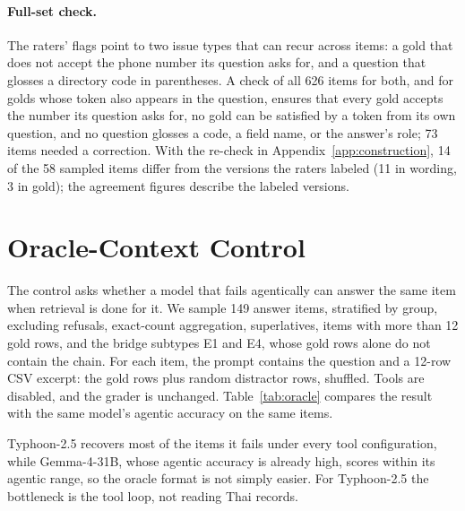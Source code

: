 \documentclass[11pt]{article}
\begin{document}
\paragraph{Full-set check.} The raters' flags point to two issue types that can recur across items: a
gold that does not accept the phone number its question asks for, and a question that glosses a
directory code in parentheses. A check of all 626 items for both, and for golds whose token also appears
in the question, ensures that every gold accepts the number its question asks for, no gold can be
satisfied by a token from its own question, and no question glosses a code, a field name, or the answer's
role; 73 items needed a correction. With the re-check in Appendix~\ref{app:construction}, 14 of the 58
sampled items differ from the versions the raters labeled (11 in wording, 3 in gold); the agreement
figures describe the labeled versions.

\section{Oracle-Context Control}
\label{app:oracle}

The control asks whether a model that fails agentically can answer the same item when retrieval is done
for it. We sample 149 answer items, stratified by group, excluding refusals, exact-count aggregation,
superlatives, items with more than 12 gold rows, and the bridge subtypes E1 and E4, whose gold rows alone
do not contain the chain. For each item, the prompt contains the question and a 12-row CSV excerpt: the
gold rows plus random distractor rows, shuffled. Tools are disabled, and the grader is unchanged.
Table~\ref{tab:oracle} compares the result with the same model's agentic accuracy on the same items.

\begin{table}[h]
\centering
\small

\caption{Oracle-context control on 149 answer items. \emph{Recovered} counts the items that the model
fails under all four tool configurations but answers correctly in the oracle setting.}
\label{tab:oracle}
\end{table}

Typhoon-2.5 recovers most of the items it fails under every tool configuration, while Gemma-4-31B, whose
agentic accuracy is already high, scores within its agentic range, so the oracle format is not simply
easier. For Typhoon-2.5 the bottleneck is the tool loop, not reading Thai records.
\end{document}
